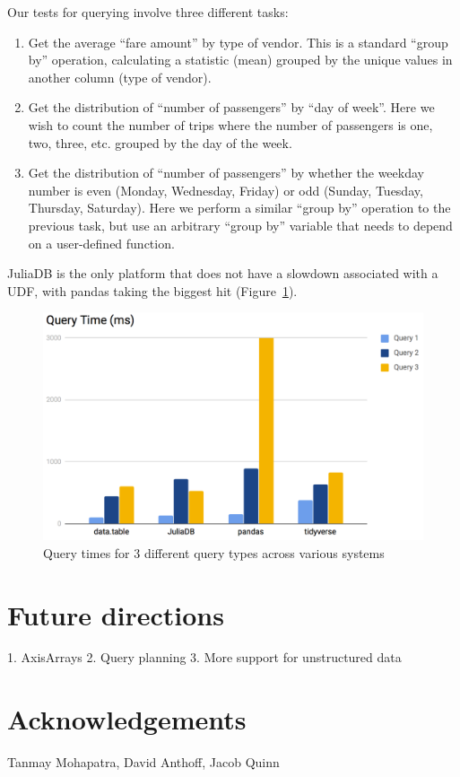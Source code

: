 \documentclass{juliacon}
\begin{document}
Our tests for querying involve three different tasks: 
\begin{enumerate}
\item Get the average “fare amount” by type of vendor. This is a standard
“group by” operation, calculating a statistic (mean) grouped by the
unique values in another column (type of vendor). 
\item Get the distribution of “number of passengers” by “day of week”. Here
we wish to count the number of trips where the number of passengers
is one, two, three, etc. grouped by the day of the week. 
\item Get the distribution of “number of passengers” by whether the weekday
number is even (Monday, Wednesday, Friday) or odd (Sunday, Tuesday,
Thursday, Saturday). Here we perform a similar “group by” operation
to the previous task, but use an arbitrary “group by” variable that
needs to depend on a user-defined function. 
\end{enumerate}
JuliaDB is the only platform that does not have a slowdown associated
with a UDF, with pandas taking the biggest hit (Figure~\ref{fig:nyctaxiquery}).

\begin{figure}[h]
\centering \includegraphics[width=5in]{image4.png} \caption{Query times for 3 different query types across various systems}
\label{fig:nyctaxiquery} 
\end{figure}

\section{Future directions}

1. AxisArrays
2. Query planning
3. More support for unstructured data

\section{Acknowledgements}

Tanmay Mohapatra, David Anthoff, Jacob Quinn


\end{document}
